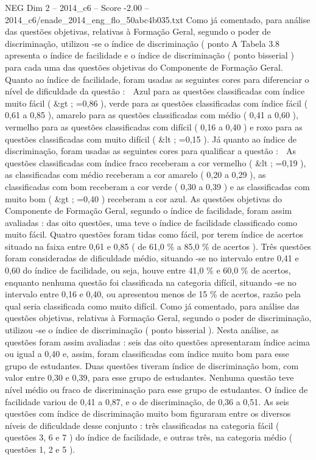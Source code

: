 \begin{textsample}{NEG Dim 2 – 2014\_c6 – Score -2.00 – 2014\_c6/enade\_2014\_eng\_flo\_50abc4b035.txt}
Como já comentado, para análise das questões objetivas, relativas à Formação Geral, segundo o poder de discriminação, utilizou -se o índice de discriminação ( ponto A Tabela 3.8 apresenta o índice de facilidade e o índice de discriminação ( ponto bisserial ) para cada uma das questões objetivas do Componente de Formação Geral.
Quanto ao índice de facilidade, foram usadas as seguintes cores para diferenciar o nível de dificuldade da questão :  Azul para as questões classificadas com índice muito fácil ( \&gt ; =0,86 ), verde para as questões classificadas com índice fácil ( 0,61 a 0,85 ), amarelo para as questões classificadas com médio ( 0,41 a 0,60 ), vermelho para as questões classificadas com difícil ( 0,16 a 0,40 ) e roxo para as questões classificadas com muito difícil ( \&lt ; =0,15 ).
Já quanto ao índice de discriminação, foram usadas as seguintes cores para qualificar a questão :  As questões classificadas com índice fraco receberam a cor vermelho ( \&lt ; =0,19 ), as classificadas com médio receberam a cor amarelo ( 0,20 a 0,29 ), as classificadas com bom receberam a cor verde ( 0,30 a 0,39 ) e as classificadas com muito bom ( \&gt ; =0,40 ) receberam a cor azul.
As questões objetivas do Componente de Formação Geral, segundo o índice de facilidade, foram assim avaliadas : das oito questões, uma teve o índice de facilidade classificado como muito fácil.
Quatro questões foram tidas como fácil, por terem índice de acertos situado na faixa entre 0,61 e 0,85 ( de 61,0 \% a 85,0 \% de acertos ).
Três questões foram consideradas de dificuldade médio, situando -se no intervalo entre 0,41 e 0,60 do índice de facilidade, ou seja, houve entre 41,0 \% e 60,0 \% de acertos, enquanto nenhuma questão foi classificada na categoria difícil, situando -se no intervalo entre 0,16 e 0,40, ou apresentou menos de 15 \% de acertos, razão pela qual seria classificada como muito difícil.
Como já comentado, para análise das questões objetivas, relativas à Formação Geral, segundo o poder de discriminação, utilizou -se o índice de discriminação ( ponto bisserial ).
Nesta análise, as questões foram assim avaliadas : seis das oito questões apresentaram índice acima ou igual a 0,40 e, assim, foram classificadas com índice muito bom para esse grupo de estudantes.
Duas questões tiveram índice de discriminação bom, com valor entre 0,30 e 0,39, para esse grupo de estudantes.
Nenhuma questão teve nível médio ou fraco de discriminação para esse grupo de estudantes.
O índice de facilidade variou de 0,41 a 0,87, e o de discriminação, de 0,36 a 0,51.
As seis questões com índice de discriminação muito bom figuraram entre os diversos níveis de dificuldade desse conjunto : três classificadas na categoria fácil ( questões 3, 6 e 7 ) do índice de facilidade, e outras três, na categoria médio ( questões 1, 2 e 5 ).

\end{textsample}
